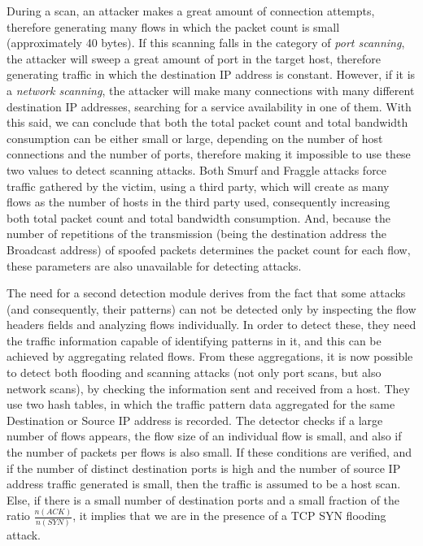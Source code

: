 \documentclass[runningheads,a4paper]{llncs}
\begin{document}
During a scan, an attacker makes a great amount of connection attempts, therefore generating many flows in which the packet count is small (approximately 40 bytes). If this scanning falls in the category of \textit{port scanning}, the attacker will sweep a great amount of port in the target host, therefore generating traffic in which the destination IP address is constant. However, if it is a \textit{network scanning}, the attacker will make many connections with many different destination IP addresses, searching for a service availability in one of them. With this said, we can conclude that both the total packet count and total bandwidth consumption can be either small or large, depending on the number of host connections and the number of ports, therefore making it impossible to use these two values to detect scanning attacks. Both Smurf and Fraggle attacks force traffic gathered by the victim, using a third party, which will create as many flows as the number of hosts in the third party used, consequently increasing both total packet count and total bandwidth consumption. And, because the number of repetitions of the transmission (being the destination address the Broadcast address) of spoofed packets determines the packet count for each flow, these parameters are also unavailable for detecting attacks.

The need for a second detection module derives from the fact that some attacks (and consequently, their patterns) can not be detected only by inspecting the flow headers fields and analyzing flows individually. In order to detect these, they need the traffic information capable of identifying patterns in it, and this can be achieved by aggregating related flows. From these aggregations, it is now possible to detect both flooding and scanning attacks (not only port scans, but also network scans), by checking the information sent and received from a host. They use two hash tables, in which the traffic pattern data aggregated for the same Destination or Source IP address is recorded. The detector checks if a large number of flows appears, the flow size of an individual flow is small, and also if the number of packets per flows is also small. If these conditions are verified, and if the number of distinct destination ports is high and the number of source IP address traffic generated is small, then the traffic is assumed to be a host scan. Else, if there is a small number of destination ports and a small fraction of the ratio $\frac{n(ACK)}{n(SYN)}$, it implies that we are in the presence of a TCP SYN flooding attack.
\end{document}
